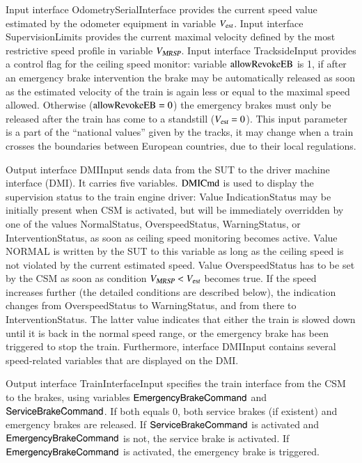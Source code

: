 Input interface {\sf OdometrySerialInterface} provides the current
speed value estimated by the odometer equipment in variable
${V_{\text{\sl est}}}$. Input interface {\sf SupervisionLimits} provides the current
maximal velocity defined by the most restrictive speed profile in
variable ${V_{\text{\sl MRSP}}}$. Input interface {\sf TracksideInput} provides a
control flag for the ceiling speed monitor: variable $\text{allowRevokeEB}$ is 1, if
after an emergency brake intervention the brake may be automatically
released as soon as the estimated velocity of the train is again less
or equal to the maximal speed allowed. Otherwise ($\text{allowRevokeEB} = 0$) the
emergency brakes must only be released after the train has come to a
standstill (${V_{\text{\sl est}}} = 0$).  This input parameter is a part of the
``national values'' given by the tracks, it may change when a train
crosses the boundaries between European countries, due to their local
regulations.

Output interface {\sf DMIInput} sends data from the SUT to the driver
machine interface (DMI). It carries five variables. $\text{DMICmd}$ is used
to display the supervision status to the train engine driver: Value
{\sf IndicationStatus} may be initially present when CSM is activated,
but will be immediately overridden by one of the values {\sf
  NormalStatus}, {\sf OverspeedStatus}, {\sf WarningStatus}, or {\sf
  InterventionStatus}, as soon as ceiling speed monitoring becomes
active. Value {\sf NORMAL} is written by the SUT to this variable as long as
the ceiling speed is not violated by the current estimated
speed. Value {\sf OverspeedStatus} has to be set by the CSM as soon as
condition ${V_{\text{\sl MRSP}}} < {V_{\text{\sl est}}}$ becomes true. If the speed increases further
(the detailed conditions are described below), the indication changes
from {\sf OverspeedStatus} to {\sf WarningStatus}, and from there to
{\sf InterventionStatus}. The latter value indicates that either the
train is slowed down until it is back in the normal speed range, or
the emergency brake has been triggered to stop the train.
Furthermore, interface {\sf DMIInput} contains several speed-related
variables that are displayed on the DMI.





Output interface {\sf TrainInterfaceInput} specifies the train
interface from the CSM to the brakes, using variables $\mathsf{EmergencyBrakeCommand}$ and
$\mathsf{ServiceBrakeCommand}$. If both equals $0$, both service
brakes (if existent) and emergency brakes are released. If $\mathsf{ServiceBrakeCommand}$ is
activated and $\mathsf{EmergencyBrakeCommand}$ is not, the service brake is activated. If
$\mathsf{EmergencyBrakeCommand}$ is activated, the emergency brake is
triggered.

